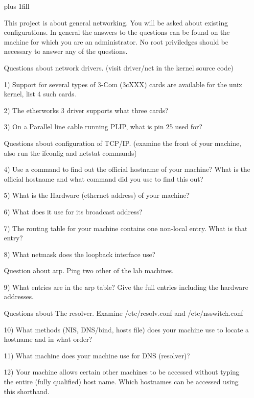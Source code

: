 
\rightskip=0pt plus 1fill

\parindent 0pt

This project is about general networking.
You will be asked about existing configurations. 
In general the answers to the questions can be found on the machine for
which you are an administrator.
No root priviledges should be necessary to answer any of the questions.

Questions about network drivers.
(visit {\ltt{}driver/net} in the kernel source code)

1) Support for several types of 3-Com (3cXXX) cards are available
for the unix kernel, list 4 such cards.

2) The etherworks 3 driver supports what three cards?

3) On a Parallel line cable running PLIP, what is pin 25 used for?

Questions about configuration of TCP/IP.
(examine the front of your machine, also run the ifconfig and netstat commands)

4) Use a command to find out the official hostname of your machine?
What is the official hostname and what command did you use to find this out?

5) What is the Hardware (ethernet address) of your machine?

6) What does it use for its broadcast address?

7) The routing table for your machine contains one non-local entry.
What is that entry?

8) What netmask does the loopback interface use?

Question about arp.  Ping two other of the lab machines. 

9) What entries are in the arp table?
Give the full entries including the hardware addresses.

Questions about The resolver. 
Examine {\ltt{}/etc/resolv.conf} and {\ltt{}/etc/nsswitch.conf}

10) What methods (NIS, DNS/bind, hosts file) does your machine use
to locate a hostname and in what order?

11) What machine does your machine use for DNS (resolver)?

12) Your machine allows certain other machines to be accessed without
typing the entire (fully qualified) host name. Which hostnames can
be accessed using this shorthand.
\bye
